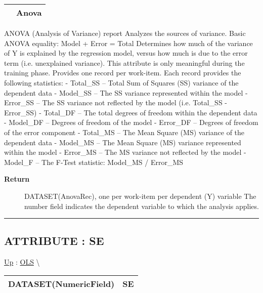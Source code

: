 {\renewcommand{\arraystretch}{1.5}
\begin{tabularx}{\textwidth}{|>{\raggedright\arraybackslash}l|X|}
\hline
\hspace{0pt} & Anova \\
\hline
\end{tabularx}
}

\par
ANOVA (Analysis of Variance) report Analyzes the sources of variance. Basic ANOVA equality: Model + Error = Total Determines how much of the variance of Y is explained by the regression model, versus how much is due to the error term (i.e. unexplained variance). This attribute is only meaningful during the training phase. Provides one record per work-item. Each record provides the following statistics: - Total\_SS -- Total Sum of Squares (SS) variance of the dependent data - Model\_SS -- The SS variance represented within the model - Error\_SS -- The SS variance not reflected by the model (i.e. Total\_SS - Error\_SS) - Total\_DF -- The total degrees of freedom within the dependent data - Model\_DF -- Degrees of freedom of the model - Error\_DF -- Degrees of freedom of the error component - Total\_MS -- The Mean Square (MS) variance of the dependent data - Model\_MS -- The Mean Square (MS) variance represented within the model - Error\_MS -- The MS variance not reflected by the model - Model\_F -- The F-Test statistic: Model\_MS / Error\_MS

\par
\begin{description}
\item [\textbf{Return}] DATASET(AnovaRec), one per work-item per dependent (Y) variable The number field indicates the dependent variable to which the analysis applies.
\end{description}

\rule{\linewidth}{0.5pt}
\subsection*{ATTRIBUTE : SE}
\hypertarget{ecldoc:linearregression.ols.se}{}
\hyperlink{ecldoc:linearregression.ols}{Up} :
\hspace{0pt} \hyperlink{ecldoc:linearregression.ols}{OLS} \textbackslash 

{\renewcommand{\arraystretch}{1.5}
\begin{tabularx}{\textwidth}{|>{\raggedright\arraybackslash}l|X|}
\hline
\hspace{0pt}DATASET(NumericField) & SE \\
\hline
\end{tabularx}
}

